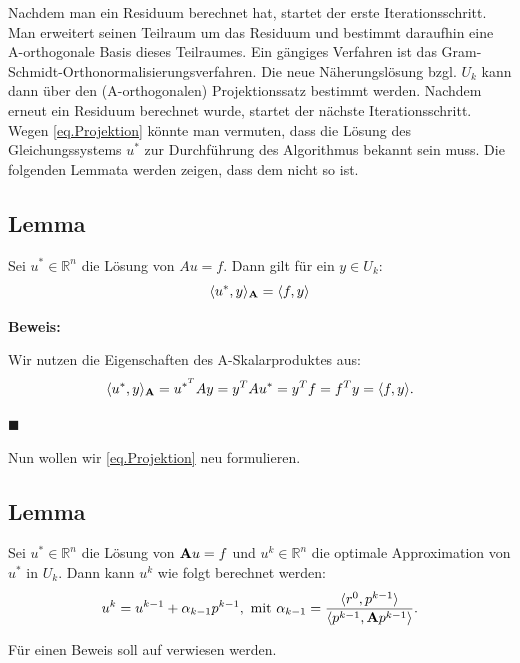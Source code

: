 Nachdem man ein Residuum berechnet hat, startet der erste Iterationsschritt. Man erweitert seinen Teilraum um das Residuum und bestimmt daraufhin eine A-orthogonale Basis dieses Teilraumes. Ein gängiges Verfahren ist das Gram-Schmidt-Orthonormalisierungsverfahren. Die neue Näherungslösung bzgl. $U_{k}$ kann dann über den (A-orthogonalen) Projektionssatz bestimmt werden. Nachdem erneut ein Residuum berechnet wurde, startet der nächste Iterationsschritt.\\
Wegen \autoref{eq.Projektion} könnte man vermuten, dass die Lösung des Gleichungssystems $u^{*}$ zur Durchführung des Algorithmus bekannt sein muss. Die folgenden Lemmata werden zeigen, dass dem nicht so ist.

\subsection{Lemma}
Sei $u^{*} \in \mathbb{R}^{n}$ die Lösung von $Au = f$. Dann gilt für ein $y \in U_{k}$:
\begin{equation}
\langle u^{*}, y \rangle _{{\textbf{A}}} = \langle f, y \rangle
\end{equation}

\textbf{Beweis:}

Wir nutzen die Eigenschaften des A-Skalarproduktes aus:
\begin{equation}
\langle u^{*}, y \rangle _{{\textbf{A}}} = u^{{*}^{T}}Ay = y^{T}Au^{*} = y^{T}f = f^{T}y = \langle f, y \rangle. \notag
\end{equation}
\begin{flushright}
$\blacksquare$
\end{flushright}

Nun wollen wir \autoref{eq.Projektion} neu formulieren.

\subsection{Lemma}
Sei $u^{*} \in \mathbb{R}^{n}$ die Lösung von ${\textbf{A}}u = f$ und $u^{k} \in \mathbb{R}^{n}$ die optimale Approximation von $u^{*}$ in $U_{k}$. Dann kann $u^{k}$ wie folgt berechnet werden:
\begin{equation}
u^{k} = u^{k-1} + \alpha_{k-1}p^{k-1}, \textnormal{ mit } \alpha_{k-1} = \frac {\langle r^{0}, p^{k-1} \rangle} {\langle {p^{k-1},  {\textbf{A}} p^{k-1}} \rangle}.\label{eq.Alpha}
\end{equation}

Für einen Beweis soll auf \cite{DR8} verwiesen werden.

